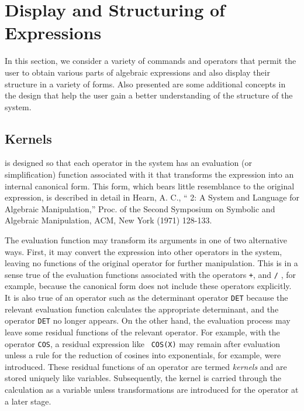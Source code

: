 \chapter{Display and Structuring of Expressions}
In this section, we consider a variety of commands and operators that
permit the user to obtain various parts of algebraic expressions and also
display their structure in a variety of forms. Also presented are some
additional concepts in the {\REDUCE} design that help the user gain a better
understanding of the structure of the system.

\section{Kernels}
{\REDUCE} is designed so that each operator in the system has an
evaluation (or simplification) function associated
with it that transforms the expression into an internal canonical form.
  This form, which bears little resemblance to the
original expression, is described in detail in Hearn, A. C., ``{\REDUCE} 2:
A System and Language for Algebraic Manipulation,'' Proc. of the Second
Symposium on Symbolic and Algebraic Manipulation, ACM, New York (1971)
128-133.

The evaluation function may transform its arguments in one of two
alternative ways.  First, it may convert the expression into other
operators in the system, leaving no functions of the original operator for
further manipulation.  This is in a sense true of the evaluation functions
associated with the operators {\tt +}, {\tt *} and {\tt /} , for example,
because the canonical form does not include these
operators explicitly.  It is also true of an operator such as the
determinant operator {\tt DET} because the relevant
evaluation function calculates the appropriate determinant, and the
operator {\tt DET} no longer appears.  On the other hand, the evaluation
process may leave some residual functions of the relevant operator.  For
example, with the operator {\tt COS}, a residual expression like {\tt
COS(X)} may remain after evaluation unless a rule for the reduction of
cosines into exponentials, for example, were introduced.  These residual
functions of an operator are termed {\em kernels\/} and are
stored uniquely like variables.  Subsequently, the kernel is carried
through the calculation as a variable unless transformations are
introduced for the operator at a later stage.

